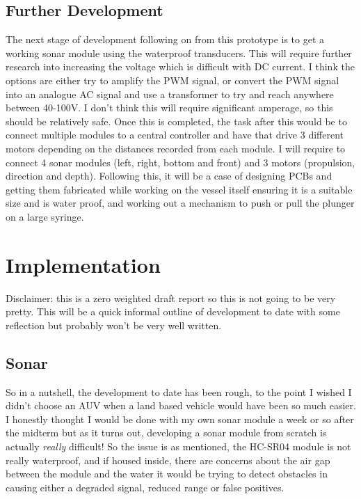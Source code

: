 \documentclass[11pt,a4paper,titlepage]{report}
\begin{document}
	\section*{Further Development}
	The next stage of development following on from this prototype is to get a working sonar module using the waterproof transducers\cite{ALUMINIUM_TRANSDUCER}. This will require further research into increasing the voltage which is difficult with DC current. I think the options are either try to amplify the PWM signal, or convert the PWM signal into an analogue AC signal and use a transformer to try and reach anywhere between 40-100\unit{\volt}. I don't think this will require significant amperage, so this should be relatively safe. Once this is completed, the task after this would be to connect multiple modules to a central controller and have that drive 3 different motors depending on the distances recorded from each module. I will require to connect 4 sonar modules (left, right, bottom and front) and 3 motors (propulsion, direction and depth). Following this, it will be a case of designing PCBs and getting them fabricated while working on the vessel itself ensuring it is a suitable size and is water proof, and working out a mechanism to push or pull the plunger on a large syringe.
	
	\chapter*{Implementation}
	Disclaimer: this is a zero weighted draft report so this is not going to be very pretty. This will be a quick informal outline of development to date with some reflection but probably won't be very well written. 
	
	\section*{Sonar}
	
	So in a nutshell, the development to date has been rough, to the point I wished I didn't choose an AUV when a land based vehicle would have been so much easier. I honestly thought I would be done with my own sonar module a week or so after the midterm but as it turns out, developing a sonar module from scratch is actually \textit{really} difficult! So the issue is as mentioned, the HC-SR04\cite{HC-SR04} module is not really waterproof, and if housed inside, there are concerns about the air gap between the module and the water it would be trying to detect obstacles in causing either a degraded signal, reduced range or false positives. 
	
\end{document}
